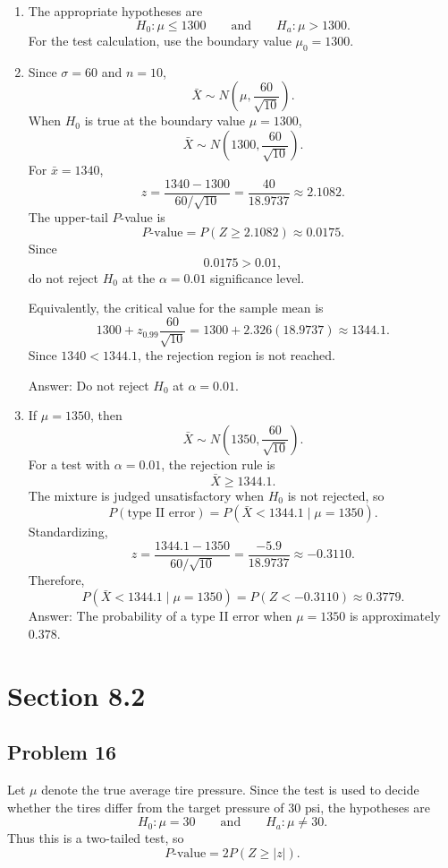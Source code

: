 \documentclass[11pt]{article}
\begin{document}
\begin{enumerate}
\item[(a)] The appropriate hypotheses are
\[
H_0:\mu\le 1300
\qquad \text{and} \qquad
H_a:\mu>1300.
\]
For the test calculation, use the boundary value $\mu_0=1300$.

\item[(b)] Since $\sigma=60$ and $n=10$,
\[
\bar{X}\sim N\left(\mu,\frac{60}{\sqrt{10}}\right).
\]
When $H_0$ is true at the boundary value $\mu=1300$,
\[
\bar{X}\sim N\left(1300,\frac{60}{\sqrt{10}}\right).
\]
For $\bar{x}=1340$,
\[
z=\frac{1340-1300}{60/\sqrt{10}}
=\frac{40}{18.9737}
\approx 2.1082.
\]
The upper-tail $P$-value is
\[
P\text{-value}=P(Z\ge 2.1082)\approx 0.0175.
\]
Since
\[
0.0175>0.01,
\]
do not reject $H_0$ at the $\alpha=0.01$ significance level.

Equivalently, the critical value for the sample mean is
\[
1300+z_{0.99}\frac{60}{\sqrt{10}}
=1300+2.326(18.9737)
\approx 1344.1.
\]
Since $1340<1344.1$, the rejection region is not reached.

Answer: Do not reject $H_0$ at $\alpha=0.01$.

\item[(c)] If $\mu=1350$, then
\[
\bar{X}\sim N\left(1350,\frac{60}{\sqrt{10}}\right).
\]
For a test with $\alpha=0.01$, the rejection rule is
\[
\bar{X}\ge 1344.1.
\]
The mixture is judged unsatisfactory when $H_0$ is not rejected, so
\[
P(\text{type II error})=P(\bar{X}<1344.1\mid \mu=1350).
\]
Standardizing,
\[
z=\frac{1344.1-1350}{60/\sqrt{10}}
=\frac{-5.9}{18.9737}
\approx -0.3110.
\]
Therefore,
\[
P(\bar{X}<1344.1\mid \mu=1350)
=P(Z<-0.3110)
\approx 0.3779.
\]
Answer: The probability of a type II error when $\mu=1350$ is approximately $0.378$.
\end{enumerate}

\section*{Section 8.2}

\subsection*{Problem 16}

Let $\mu$ denote the true average tire pressure. Since the test is used to decide whether the tires differ from the target pressure of 30 psi, the hypotheses are
\[
H_0:\mu=30
\qquad \text{and} \qquad
H_a:\mu\neq 30.
\]
Thus this is a two-tailed test, so
\[
P\text{-value}=2P(Z\ge |z|).
\]
\end{document}
